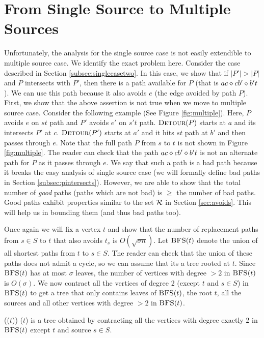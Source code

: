 \iflong
\else
\vspace{-2mm}
\fi
\section{From Single Source to Multiple Sources}

Unfortunately, the analysis for the single source case is not easily extendible to multiple source case. We identify the exact problem here. Consider the case described in Section \ref{subsec:singlecasetwo}. In this case, we show that if $|P'| > |P|$ and $P$ intersects with $P'$, then there is a path available for $P$ (that is $ac \diamond
cb' \diamond b't$).  We can use this path because it also avoids $e $ (the edge avoided by path $P$). First, we show that the above assertion is not true when we move to multiple source case. Consider the following example (See Figure \ref{fig:multiple}).
Here, $P$ avoids $e$ on $st$ path and $P'$ avoids $e'$ on $s't$ path. $\textsc{Detour}(P)$ starts at $a$ and its intersects $P'$ at $c$. $\textsc{Detour}(P')$ starts at $a'$ and it hits $st$ path at $b'$ and then   passes through $e$. Note that the full path $P$ from $s$ to $t$ is not shown in Figure \ref{fig:multiple}. The reader can check that the  path $ac \diamond
cb' \diamond b't$ is not an alternate path for $P$ as it passes through $e$. We say that such a path is a bad path because it breaks the easy analysis of single source case (we will formally define bad paths in Section \ref{subsec:pintersects}).
However, we are able to show that the total number of {\em good} paths (paths which are not bad)
is $\ge$ the number of bad paths. Good paths exhibit properties similar to the set
$\mathcal{R}$ in Section \ref{sec:avoids}. This will help us in bounding them (and thus bad paths too).
\label{sec:problem}
\iflong

\fi
Once again we will fix a vertex $t$ and show that  the number of replacement paths from
$s \in S$ to $t$ that also avoids $t_s$ is $ O(\sqrt {\sigma n})$.
Let $\textsc{BFS}(t)$ denote  the  union of all  shortest paths from $t$ to $s \in S$.
The reader can check that the union of these paths does not admit a cycle, so we
can assume that its a tree rooted at $t$. Since $\textsc{BFS}(t)$ has at most $\sigma$
leaves, the number of vertices with degree $> 2$ in $\textsc{BFS}(t)$ is $O(\sigma)$.
We now contract all the vertices of degree 2 (except $t$ and $s \in S$) in $\textsc{BFS}(t)$
to get a tree that only contains
leaves of $\textsc{BFS}(t)$, the root $t$, all the sources and all other vertices
with degree $> 2$ in $\textsc{BFS}(t)$.
\begin{definition} (\SBFS($t$))
\SBFS($t$) is a tree obtained by contracting all the vertices with degree exactly 2 in $\textsc{BFS}(t)$
except $t$ and source $s \in S$.
\end{definition}

